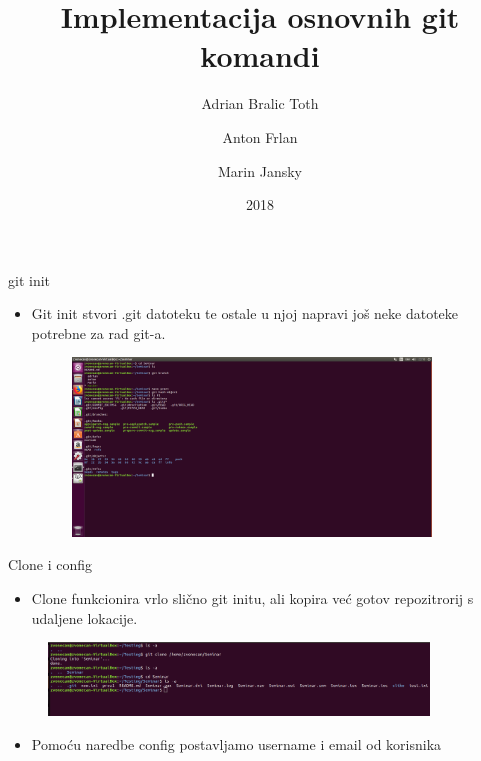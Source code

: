 \documentclass{beamer}
\title{Implementacija osnovnih git komandi}
\author{Adrian Bralic Toth \and Anton Frlan \and Marin Jansky}
\institute{Tehnički Fakultet Rijeka}
\date{2018}
\begin{document}
\frame{\titlepage}

 

\begin{frame}{git init}

\begin{itemize}
	\setlength\itemsep{2em}
	\item Git init stvori .git datoteku te ostale u njoj napravi još neke datoteke potrebne za rad git-a.
	\begin{figure}
\centering
\includegraphics[width=0.9\textwidth]{./slike/git_datoteka.png}
\end{figure}
\end{itemize}

\end{frame}

\begin{frame}{Clone i config}

\begin{itemize}
	\item Clone funkcionira vrlo slično git initu, ali kopira već gotov repozitrorij s udaljene lokacije.
\end{itemize}
	\begin{figure}
		\includegraphics[width=0.9\textwidth]{./slike/b.png}
	\end{figure}
\begin{itemize}
	\item Pomoću naredbe config postavljamo username i email od korisnika
\end{itemize}

\end{frame}
\end{document}
